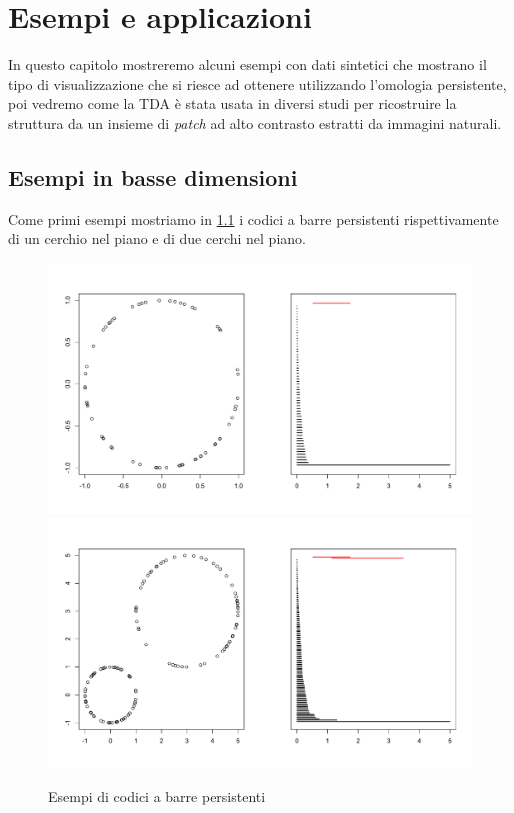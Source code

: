 \chapter{Esempi e applicazioni}\label{cap:esempi}

In questo capitolo mostreremo alcuni esempi con dati sintetici che mostrano il tipo di visualizzazione che si riesce ad ottenere utilizzando l'omologia persistente, poi vedremo come la TDA è stata usata in diversi studi per ricostruire la struttura da un insieme di \emph{patch} ad alto contrasto estratti da immagini naturali.

\section{Esempi in basse dimensioni}

Come primi esempi mostriamo in \cref{fig:examplecirclesbarcodes} i codici a barre persistenti rispettivamente di un cerchio nel piano e di due cerchi nel piano.

\begin{figure}[h]
  \caption{Esempi di codici a barre persistenti}
  \label{fig:examplecirclesbarcodes}
  \centering
  \includegraphics[width=.8\linewidth]{gfx/circle_persistence.pdf}
  \centering
  \includegraphics[width=.8\linewidth]{gfx/two_circles.pdf}
\end{figure}

